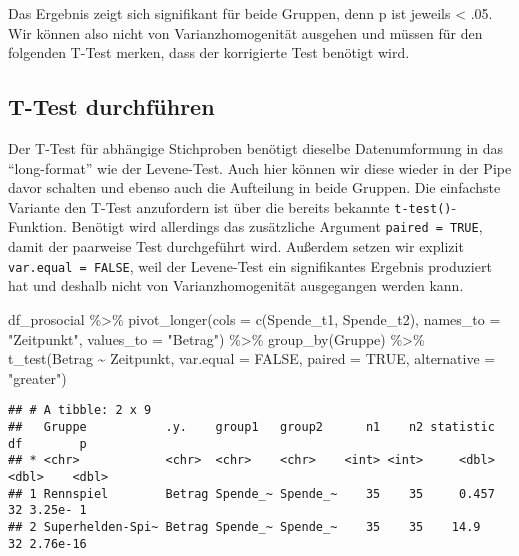 \documentclass[
]{book}
\newenvironment{Shaded}{\begin{snugshade}}{\end{snugshade}}
\newcommand{\AttributeTok}[1]{\textcolor[rgb]{0.77,0.63,0.00}{#1}}
\newcommand{\ConstantTok}[1]{\textcolor[rgb]{0.00,0.00,0.00}{#1}}
\newcommand{\FunctionTok}[1]{\textcolor[rgb]{0.00,0.00,0.00}{#1}}
\newcommand{\NormalTok}[1]{#1}
\newcommand{\SpecialCharTok}[1]{\textcolor[rgb]{0.00,0.00,0.00}{#1}}
\newcommand{\StringTok}[1]{\textcolor[rgb]{0.31,0.60,0.02}{#1}}
\begin{document}
Das Ergebnis zeigt sich signifikant für beide Gruppen, denn p ist jeweils \textless{} .05. Wir können also nicht von Varianzhomogenität ausgehen und müssen für den folgenden T-Test merken, dass der korrigierte Test benötigt wird.

\hypertarget{t-test-durchfuxfchren-2}{%
\subsection{T-Test durchführen}\label{t-test-durchfuxfchren-2}}

Der T-Test für abhängige Stichproben benötigt dieselbe Datenumformung in das ``long-format'' wie der Levene-Test. Auch hier können wir diese wieder in der Pipe davor schalten und ebenso auch die Aufteilung in beide Gruppen. Die einfachste Variante den T-Test anzufordern ist über die bereits bekannte \texttt{t-test()}- Funktion. Benötigt wird allerdings das zusätzliche Argument \texttt{paired\ =\ TRUE}, damit der paarweise Test durchgeführt wird. Außerdem setzen wir explizit \texttt{var.equal\ =\ FALSE}, weil der Levene-Test ein signifikantes Ergebnis produziert hat und deshalb nicht von Varianzhomogenität ausgegangen werden kann.

\begin{Shaded}
\begin{Highlighting}[]
\NormalTok{df\_prosocial }\SpecialCharTok{\%\textgreater{}\%}
        \FunctionTok{pivot\_longer}\NormalTok{(}\AttributeTok{cols =} \FunctionTok{c}\NormalTok{(Spende\_t1, Spende\_t2), }
                     \AttributeTok{names\_to =} \StringTok{"Zeitpunkt"}\NormalTok{, }
                     \AttributeTok{values\_to =} \StringTok{"Betrag"}\NormalTok{) }\SpecialCharTok{\%\textgreater{}\%} 
        \FunctionTok{group\_by}\NormalTok{(Gruppe) }\SpecialCharTok{\%\textgreater{}\%} 
        \FunctionTok{t\_test}\NormalTok{(Betrag }\SpecialCharTok{\textasciitilde{}}\NormalTok{ Zeitpunkt, }
               \AttributeTok{var.equal =} \ConstantTok{FALSE}\NormalTok{, }
               \AttributeTok{paired =} \ConstantTok{TRUE}\NormalTok{,}
               \AttributeTok{alternative =} \StringTok{"greater"}\NormalTok{)}
\end{Highlighting}
\end{Shaded}

\begin{verbatim}
## # A tibble: 2 x 9
##   Gruppe           .y.    group1   group2      n1    n2 statistic    df        p
## * <chr>            <chr>  <chr>    <chr>    <int> <int>     <dbl> <dbl>    <dbl>
## 1 Rennspiel        Betrag Spende_~ Spende_~    35    35     0.457    32 3.25e- 1
## 2 Superhelden-Spi~ Betrag Spende_~ Spende_~    35    35    14.9      32 2.76e-16
\end{verbatim}
\end{document}
